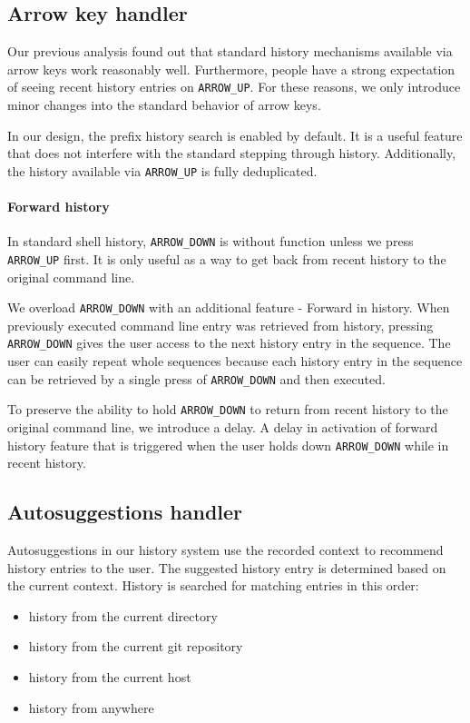 \subsection{Arrow key handler}

Our previous analysis found out that standard history mechanisms available via arrow keys work reasonably well. Furthermore, people have a strong expectation of seeing recent history entries on \verb|ARROW_UP|. 
For these reasons, we only introduce minor changes into the standard behavior of arrow keys.


In our design, the prefix history search is enabled by default. It is a useful feature that does not interfere with the standard stepping through history. Additionally, the history available via \verb|ARROW_UP| is fully deduplicated.

\paragraph{Forward history}

In standard shell history, \verb|ARROW_DOWN| is without function unless we press \verb|ARROW_UP| first. It is only useful as a way to get back from recent history to the original command line.

We overload \verb|ARROW_DOWN| with an additional feature - Forward in history. When previously executed command line entry was retrieved from history, pressing \verb|ARROW_DOWN| gives the user access to the next history entry in the sequence. 
The user can easily repeat whole sequences because each history entry in the sequence can be retrieved by a single press of \verb|ARROW_DOWN| and then executed. 


To preserve the ability to hold \verb|ARROW_DOWN| to return from recent history to the original command line, we introduce a delay. A delay in activation of forward history feature that is triggered when the user holds down \verb|ARROW_DOWN| while in recent history.

\subsection{Autosuggestions handler}

Autosuggestions in our history system use the recorded context to recommend history entries to the user. The suggested history entry is determined based on the current context. History is searched for matching entries in this order:

\begin{itemize}
\item history from the current directory
\item history from the current git repository
\item history from the current host
\item history from anywhere
\end{itemize}

